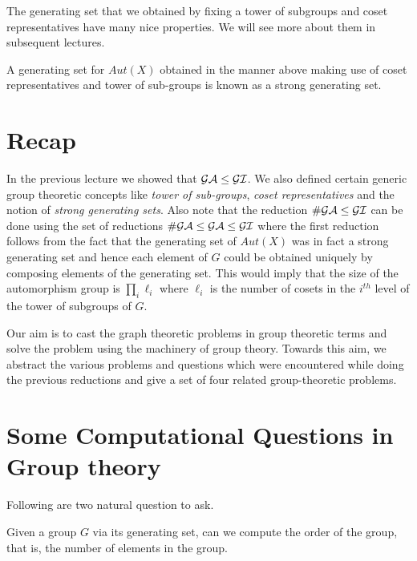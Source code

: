The generating set that we obtained by fixing a tower of subgroups and coset
representatives have many nice properties. We will see more about them in
subsequent lectures.
\begin{definition}
	A generating set for $Aut(X)$ obtained in the manner above making use
	of coset representatives and tower of sub-groups is known as a strong
	generating set.  
\end{definition}




\section {Recap}
In the previous lecture we showed that $\cal{GA} \le \cal{GI}$. We also
defined certain generic group theoretic concepts like {\it tower of
sub-groups}, {\it coset representatives} and the notion of {\it strong
generating sets}.  Also note that the reduction $\cal{\#GA} \le \cal{GI}$ can
be done using the set of reductions ${\cal{\#GA} \le \cal{GA} \le \cal{GI}}$
where the first reduction follows from the fact that the generating set of
$Aut(X)$ was in fact a strong generating set and hence each element of $G$
could be obtained uniquely by composing elements of the generating set. 
This would imply that the size of the automorphism group is $\displaystyle
\prod_{i} \ell_{i}$ where $\ell_i$ is the number of cosets in the $i^{th}$
level of the tower of subgroups of $G$.

Our aim is to cast the graph theoretic problems in group theoretic terms and
solve the problem using the machinery of group theory.  Towards this aim, we
abstract the various problems and questions which were encountered while
doing the previous reductions and give a set of four related group-theoretic
problems.

\section{Some Computational Questions in Group theory}
\label{sec:comp-questions}
Following are two natural question to ask.
\begin{problem} 
	Given a group $G$ via its generating set, can we compute the order of
	the group, that is, the number of elements in the group. 
\end{problem}

